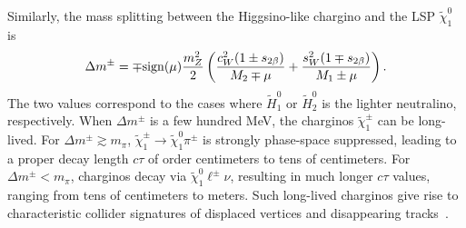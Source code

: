 \documentclass[
    twocolumn,
    superscriptaddress,
    amsmath, 
    amssymb,
    aps,
    reprint,
    floatfix
]{revtex4-2}
\newcommand{\Wei}[1]{\textcolor{green2} {Wei: #1}}
\begin{document}
 Similarly, the mass splitting between the Higgsino-like chargino and the LSP $\tilde{\chi}_1^0$ is
 {\small
\begin{equation}
\label{eq:msplitc1N1}
\Delta m^\pm  = \mp {\rm sign}(\mu) \frac{m_Z^2}{2} \left( \frac{ c_W^2 (1 \pm s_{2\beta})}{M_2 \mp \mu }  +  \frac{ s_W^2 (1\mp s_{2\beta})}{M_1 \pm \mu} \right). 
\end{equation}
}
The two values correspond to the cases where $\tilde{H}_1^0$ or $\tilde{H}_2^0$ is the lighter neutralino, respectively. When $\Delta m^\pm$ is a few hundred MeV, the charginos $\tilde\chi_1^\pm$ can be long-lived. For $\Delta m^\pm \gtrsim m_\pi$, $\tilde\chi_1^\pm \to \tilde\chi_1^0 \pi^\pm$ is strongly phase-space suppressed, leading to a proper decay length $c\tau$ of order centimeters to tens of centimeters. For $\Delta m^\pm < m_\pi$, charginos decay via $\tilde\chi_1^0 \ell^\pm \nu$, resulting in much longer $c\tau$ values, ranging from tens of centimeters to meters. Such long-lived charginos give rise to characteristic collider signatures of displaced vertices and disappearing tracks~\cite{Chen:1996ap, ATLAS:2024umc, CMS:2025twk, ATLAS:2022rme, CMS:2023mny}.



\end{document}
